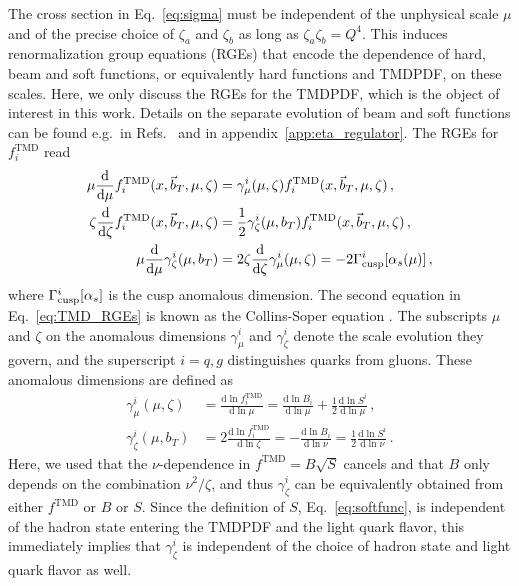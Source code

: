 \documentclass[11pt,a4paper]{article}
\DeclareRobustCommand{\eq}[1]{Eq.~\eqref{eq:#1}}
\DeclareRobustCommand{\app}[1]{appendix~\ref{app:#1}}
\DeclareRobustCommand{\mycites}[1]{Refs.~\cite{#1}}
\newcommand{\df}{\mathrm{d}}
\newcommand{\nn}{\nonumber}
\newcommand{\as}{\alpha_s}
\newcommand\TMD{\mathrm{TMD}}
\newcommand{\bt}{\vec b_T}
\newcommand{\GammaC}{\Gamma_{\rm cusp}}
\begin{document}
The cross section in \eq{sigma} must be independent of the unphysical scale $\mu$ and of the precise choice of $\zeta_a$ and $\zeta_b$ as long as $\zeta_a \zeta_b = Q^4$.
This induces renormalization group equations (RGEs) that encode the dependence of hard, beam and soft functions,
or equivalently hard functions and TMDPDF, on these scales.
Here, we only discuss the RGEs for the TMDPDF, which is the object of interest in this work.
Details on the separate evolution of beam and soft functions can be found e.g.\ in \mycites{Chiu:2012ir,Ebert:2016gcn} and in \app{eta_regulator}.
%
The RGEs for $f_i^\TMD$ read
\begin{align} \label{eq:TMD_RGEs}
\mu \frac{\df}{\df\mu} f^\TMD_i(x, \bt, \mu, \zeta) &
= \gamma^i_\mu(\mu,\zeta) f^\TMD_i(x, \bt, \mu, \zeta)
\,,\nn\\
\zeta \frac{\df}{\df\zeta} f^\TMD_i(x, \bt, \mu, \zeta) &
= \frac{1}{2} \gamma^i_\zeta(\mu,b_T) f^\TMD_i(x, \bt, \mu, \zeta)
\,,\nn\\
 \mu \frac{\df}{\df\mu} \gamma_\zeta^i(\mu,b_T)
 &= 2 \zeta \frac{\df}{\df\zeta} \gamma_\mu^i(\mu,\zeta) = -2 \GammaC^i[\as(\mu)]
\,,\end{align}
where $\GammaC^i[\as]$ is the cusp anomalous dimension.
The second equation in \eq{TMD_RGEs} is known as the Collins-Soper equation \cite{Collins:1981va,Collins:1981uk}.
The subscripts $\mu$ and $\zeta$ on the anomalous dimensions $\gamma_\mu^i$ and $\gamma_\zeta^i$ denote the scale evolution they govern, and the superscript $i = q,g$ distinguishes quarks from gluons.
These anomalous dimensions are defined as
\begin{align}
 \gamma_\mu^i(\mu,\zeta) &
 = \frac{\df\ln f_i^\TMD}{\df\ln\mu}
 = \frac{\df\ln B_i}{\df\ln\mu}
   + \frac12 \frac{\df\ln S^i}{\df\ln\mu}
\,,\nn\\ \label{eq:gamma_zeta}
 \gamma_\zeta^i(\mu,b_T) &
 = 2 \frac{\df\ln f_i^\TMD}{\df\ln\zeta}
 = - \frac{\df\ln B_i}{\df\ln\nu}
 = \frac12 \frac{\df\ln S^i}{\df\ln\nu}
\,.\end{align}
Here, we used that the $\nu$-dependence in $f^\TMD = B \sqrt{S}$ cancels 
and that $B$ only depends on the combination $\nu^2/\zeta$,
and thus $\gamma_\zeta^i$ can be equivalently obtained from either $f^\TMD$ or $B$ or $S$.
Since the definition of $S$, \eq{softfunc}, is independent of the hadron state entering the TMDPDF and the light quark flavor,
this immediately implies that $\gamma_\zeta^i$ is independent of the choice of hadron state and light quark flavor as well.
\end{document}
